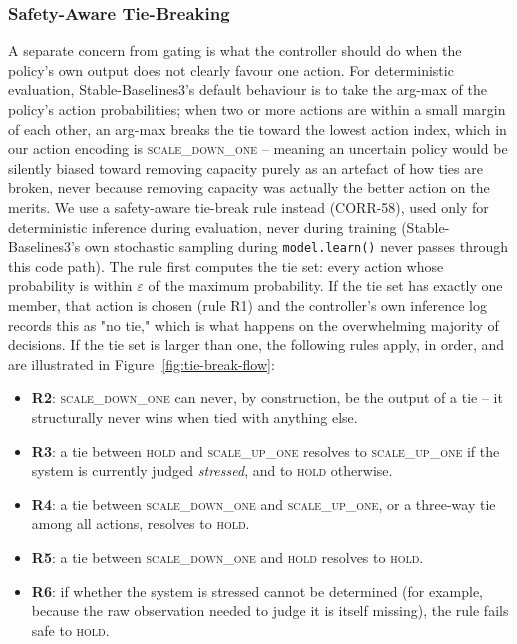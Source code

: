 \subsubsection{Safety-Aware Tie-Breaking}
\label{sec:tie-break}

A separate concern from gating is what the controller should do when the
policy's own output does not clearly favour one action. For deterministic
evaluation, Stable-Baselines3's default behaviour is to take the
arg-max of the policy's action probabilities; when two or more actions are
within a small margin of each other, an arg-max breaks the tie toward the
lowest action index, which in our action encoding is
\textsc{scale\_down\_one} -- meaning an uncertain policy would be silently
biased toward removing capacity purely as an artefact of how ties are
broken, never because removing capacity was actually the better action
on the merits. We use a safety-aware tie-break rule instead (CORR-58), used
only for deterministic inference during evaluation, never during training
(Stable-Baselines3's own stochastic sampling during \texttt{model.learn()}
never passes through this code path). The rule first computes the tie set:
every action whose probability is within $\varepsilon$ of the maximum
probability. If the tie set has exactly one member, that action is chosen
(rule R1) and the controller's own inference log records this as "no tie,"
which is what happens on the overwhelming majority of decisions. If the tie
set is larger than one, the following rules apply, in order, and are
illustrated in Figure~\ref{fig:tie-break-flow}:

\begin{itemize}[nosep]
  \item \textbf{R2}: \textsc{scale\_down\_one} can never, by construction,
    be the output of a tie -- it structurally never wins when tied with
    anything else.
  \item \textbf{R3}: a tie between \textsc{hold} and
    \textsc{scale\_up\_one} resolves to \textsc{scale\_up\_one} if the
    system is currently judged \emph{stressed}, and to \textsc{hold}
    otherwise.
  \item \textbf{R4}: a tie between \textsc{scale\_down\_one} and
    \textsc{scale\_up\_one}, or a three-way tie among all actions, resolves
    to \textsc{hold}.
  \item \textbf{R5}: a tie between \textsc{scale\_down\_one} and
    \textsc{hold} resolves to \textsc{hold}.
  \item \textbf{R6}: if whether the system is stressed cannot be determined
    (for example, because the raw observation needed to judge it is itself
    missing), the rule fails safe to \textsc{hold}.
\end{itemize}


